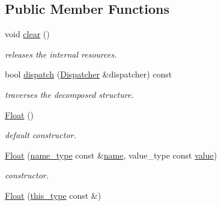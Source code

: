 \subsection*{Public Member Functions}
\begin{DoxyCompactItemize}
\item 
\hypertarget{classhryky_1_1reduction_1_1_float_a693fff0927a864c84f0f781148ce6882}{void \hyperlink{classhryky_1_1reduction_1_1_float_a693fff0927a864c84f0f781148ce6882}{clear} ()}\label{classhryky_1_1reduction_1_1_float_a693fff0927a864c84f0f781148ce6882}

\begin{DoxyCompactList}\small\item\em releases the internal resources. \end{DoxyCompactList}\item 
bool \hyperlink{classhryky_1_1reduction_1_1_base_a71b31d4d0ed915254e2cb1ef217f28c4}{dispatch} (\hyperlink{classhryky_1_1reduction_1_1_dispatcher}{Dispatcher} \&dispatcher) const 
\begin{DoxyCompactList}\small\item\em traverses the decomposed structure. \end{DoxyCompactList}\item 
\hypertarget{classhryky_1_1reduction_1_1_float_ac8301e6a6b997dc1142800282ad58fd3}{\hyperlink{classhryky_1_1reduction_1_1_float_ac8301e6a6b997dc1142800282ad58fd3}{Float} ()}\label{classhryky_1_1reduction_1_1_float_ac8301e6a6b997dc1142800282ad58fd3}

\begin{DoxyCompactList}\small\item\em default constructor. \end{DoxyCompactList}\item 
\hypertarget{classhryky_1_1reduction_1_1_float_a8c3befee6deafe25d42b322fd66bbeb1}{\hyperlink{classhryky_1_1reduction_1_1_float_a8c3befee6deafe25d42b322fd66bbeb1}{Float} (\hyperlink{namespacehryky_1_1reduction_ac686c30a4c8d196bbd0f05629a6b921f}{name\-\_\-type} const \&\hyperlink{classhryky_1_1reduction_1_1_base_a842569265d741905eb8a353d3935f1d1}{name}, value\-\_\-type const \hyperlink{classhryky_1_1reduction_1_1_float_aa172d53821cd26856950b10f67ca658b}{value})}\label{classhryky_1_1reduction_1_1_float_a8c3befee6deafe25d42b322fd66bbeb1}

\begin{DoxyCompactList}\small\item\em constructor. \end{DoxyCompactList}\item 
\hypertarget{classhryky_1_1reduction_1_1_float_a9557c2427dd9165a919dd74d32bea86c}{\hyperlink{classhryky_1_1reduction_1_1_float_a9557c2427dd9165a919dd74d32bea86c}{Float} (\hyperlink{classhryky_1_1reduction_1_1_base_af02a7dee6042080b7380afd2f9500a42}{this\-\_\-type} const \&)}\label{classhryky_1_1reduction_1_1_float_a9557c2427dd9165a919dd74d32bea86c}


\end{DoxyCompactItemize}
